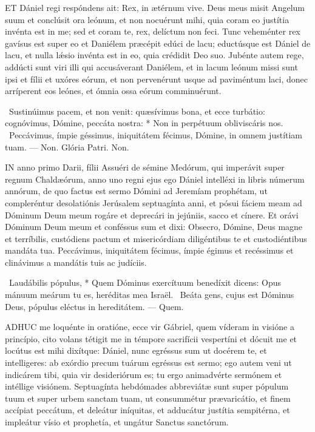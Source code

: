 
\lettrine[lines=2]{E}{T} Dániel regi respóndens ait: Rex, in ætérnum vive. Deus meus misit Angelum suum et conclúsit ora leónum, et non nocuérunt mihi, quia coram eo justítia invénta est in me; sed et coram te, rex, delíctum non feci. Tunc veheménter rex gavísus est super eo et Daniélem præcépit edúci de lacu; eductúsque est Dániel de lacu, et nulla lǽsio invénta est in eo, quia crédidit Deo suo. Jubénte autem rege, addúcti sunt viri illi qui accusáverant Daniélem, et in lacum leónum missi sunt ipsi et fílii et uxóres eórum, et non pervenérunt usque ad paviméntum laci, donec arríperent eos leónes, et ómnia ossa eórum comminuérunt.

\R\ Sustinúimus pacem, et non venit: quæsívimus bona, et ecce turbátio: cognóvimus, Dómine, peccáta nostra: * Non in perpétuum obliviscáris nos. \V\ Peccávimus, ímpie géssimus, iniquitátem fécimus, Dómine, in omnem justítiam tuam. — Non. Glória Patri. Non.




\lettrine[lines=2]{I}{N} anno primo Darii, fílii Assuéri de sémine Medórum, qui imperávit super regnum Chaldæórum, anno uno regni ejus ego Dániel intelléxi in libris númerum annórum, de quo factus est sermo Dómini ad Jeremíam prophétam, ut compleréntur desolatiónis Jerúsalem septuagínta anni, et pósui fáciem meam ad Dóminum Deum meum rogáre et deprecári in jejúniis, sacco et cínere. Et orávi Dóminum Deum meum et conféssus sum et dixi: Obsecro, Dómine, Deus magne et terríbilis, custódiens pactum et misericórdiam diligéntibus te et custodiéntibus mandáta tua. Peccávimus, iniquitátem fécimus, ímpie égimus et recéssimus et clinávimus a mandátis tuis ac judíciis.

\R\ Laudábilis pópulus, * Quem Dóminus exercítuum benedíxit dicens: Opus mánuum meárum tu es, heréditas mea Israël. \V\ Beáta gens, cujus est Dóminus Deus, pópulus eléctus in hereditátem. — Quem.


\lettrine[lines=2]{A}{DHUC} me loquénte in oratióne, ecce vir Gábriel, quem víderam in visióne a princípio, cito volans tétigit me in témpore sacrifícii vespertíni et dócuit me et locútus est mihi dixítque: Dániel, nunc egréssus sum ut docérem te, et intelligeres: ab exórdio precum tuárum egréssus est sermo; ego autem veni ut indicárem tibi, quia vir desideriórum es; tu ergo animadvérte sermónem et intéllige visiónem. Septuagínta hebdómades abbreviátæ sunt super pópulum tuum et super urbem sanctam tuam, ut consummétur prævaricátio, et finem accípiat peccátum, et deleátur iníquitas, et adducátur justítia sempitérna, et impleátur vísio et prophetía, et ungátur Sanctus sanctórum.

